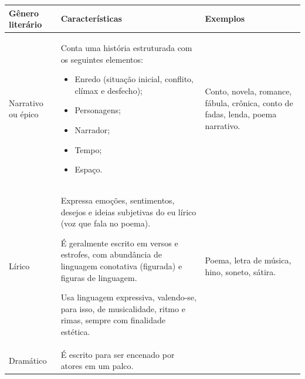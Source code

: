 \begin{longtable}[]{@{}lll@{}}
\toprule
\begin{minipage}[b]{0.29\columnwidth}\raggedright
\textbf{Gênero literário}\strut
\end{minipage} & \begin{minipage}[b]{0.29\columnwidth}\raggedright
\textbf{Características}\strut
\end{minipage} & \begin{minipage}[b]{0.29\columnwidth}\raggedright
\textbf{Exemplos}\strut
\end{minipage}\tabularnewline
\midrule
\endhead
\begin{minipage}[t]{0.29\columnwidth}\raggedright
Narrativo ou épico\strut
\end{minipage} & \begin{minipage}[t]{0.29\columnwidth}\raggedright
Conta uma história estruturada com os seguintes elementos:

\begin{itemize}
\item
  Enredo (situação inicial,
  conflito, clímax e 
  desfecho);
\item
  Personagens;
\item
  Narrador;
\item
  Tempo;
\item
  Espaço.
\end{itemize}\strut
\end{minipage} & \begin{minipage}[t]{0.29\columnwidth}\raggedright
Conto, novela, romance, fábula, crônica, conto de fadas, lenda, poema narrativo.\strut
\end{minipage}\tabularnewline
\begin{minipage}[t]{0.29\columnwidth}\raggedright
Lírico\strut
\end{minipage} & \begin{minipage}[t]{0.29\columnwidth}\raggedright
Expressa emoções, sentimentos, desejos e ideias subjetivas do eu lírico (voz que fala no poema).

É geralmente escrito em versos e estrofes, com abundância de linguagem
conotativa (figurada) e figuras de linguagem.

Usa linguagem expressiva, valendo-se, para isso, de musicalidade, ritmo e rimas, sempre com finalidade estética.\strut
\end{minipage} & \begin{minipage}[t]{0.29\columnwidth}\raggedright
Poema, letra de música, hino, soneto, sátira.\strut
\end{minipage}\tabularnewline
\begin{minipage}[t]{0.29\columnwidth}\raggedright
Dramático\strut
\end{minipage} & \begin{minipage}[t]{0.29\columnwidth}\raggedright
É escrito para ser encenado por atores em um palco.


\end{minipage}
\end{longtable}
